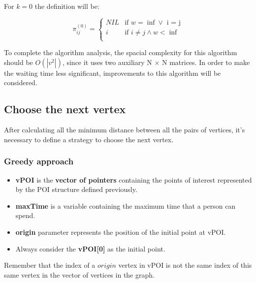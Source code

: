 \documentclass{article}
\begin{document}
    For $k = 0$ the definition will be: 
    
    \begin{equation} 
      \pi_{ij}^{(0)} =
        \begin{cases}
          NIL & \text{if } w = \inf \vee \text{ i = j}\\
          i & \text{if } i \neq j \wedge w < \inf\\
        \end{cases}      
    \end{equation}
    
    To complete the algorithm analysis, the spacial complexity for this algorithm should be $O(|v^2|)$, since it uses two auxiliary N $\times$ N matrices. \newline 
    In order to make the waiting time less significant, improvements to this algorithm will be considered. 

\subsection*{Choose the next vertex}
After calculating all the minimum distance between all the pairs of vertices, it's necessary to define a strategy to choose the next vertex. 

\subsubsection*{Greedy approach}
\begin{itemize}
    \item \textbf{vPOI} is the \textbf{vector of pointers} containing the points of interest represented by the POI structure defined previously.
    \item \textbf{maxTime} is a variable containing the maximum time that a person can spend.
    \item \textbf{origin} parameter represents the position of the initial point at vPOI. 
    \item Always consider the \textbf{vPOI[0]} as the initial point.
\end{itemize}

Remember that the index of a $origin$ vertex in vPOI is not the same index of this same vertex in the vector of vertices in the graph. 
\end{document}
